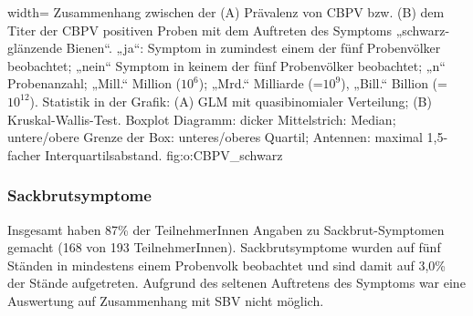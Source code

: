  
  {width=\textwidth} %
  {Zusammenhang zwischen der (A) Prävalenz von CBPV bzw. (B) dem Titer der CBPV positiven Proben mit dem Auftreten des Symptoms „schwarz-glänzende Bienen“. „ja“: Symptom in zumindest einem der fünf Probenvölker beobachtet; „nein“ Symptom in keinem der fünf Probenvölker beobachtet; „n“ Probenanzahl; „Mill.“ Million ($10^6$); „Mrd.“ Milliarde (=$10^9$), „Bill.“ Billion (=$10^{12}$). Statistik in der Grafik: (A) GLM mit quasibinomialer Verteilung; (B) Kruskal-Wallis-Test. Boxplot Diagramm: dicker Mittelstrich: Median; untere/obere Grenze der Box: unteres/oberes Quartil; Antennen: maximal 1,5-facher Interquartilsabstand.} %
  {} %
  {fig:o:CBPV_schwarz} %

\subsubsection{Sackbrutsymptome}

Insgesamt haben 87\% der TeilnehmerInnen Angaben zu Sackbrut-Symptomen gemacht (168 von 193 TeilnehmerInnen). Sackbrutsymptome wurden auf fünf Ständen in mindestens einem Probenvolk beobachtet und sind damit auf 3,0\% der Stände aufgetreten. Aufgrund des seltenen Auftretens des Symptoms war eine Auswertung auf Zusammenhang mit SBV nicht möglich.